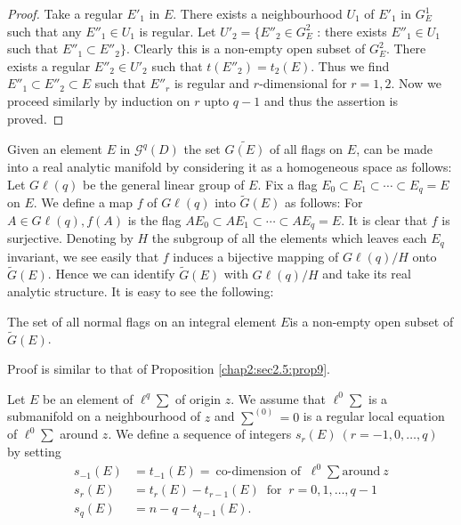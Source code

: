 \begin{proof}
  Take a regular $E'_1$ in $E$. There exists a neighbourhood $U_1$ of
  $E'_1$ in $G^1_E$ such that any $E''_1 \in U_1$ is regular. Let
  $U'_2 = \{E''_2 \in G^2_E $ : there exists $E''_1 \in U_1$ such that
  $E''_1 \subset E''_2 \}$. Clearly this is a non-empty open subset of
  $G^2_E$. There exists a regular $E''_2 \in U'_2$ such that $t
  (E''_2) = t_2 (E)$. Thus we find $E''_1 \subset  E''_2 \subset E$
  such that $E''_r$ is regular and $r$-dimensional for $r = 1,  2$. Now
  we proceed similarly by induction on $r$ upto $q-1$ and thus the
  assertion is proved.  
\end{proof}

Given an element $E$ in $\mathscr{G}^q (D)$ the set $\widetilde{G(E)}$ of all
flags on $E$,  can be made into a real analytic manifold by
considering it as a homogeneous space as follows: Let $G \ell (q)$ be
the general linear group of $E$. Fix a flag $E_0 \subset E_1 \subset
\cdots \subset E_q = E$ on $E$. We define a map $f$ of $G \ell (q)$
into $\tilde{G} (E)$ as follows: For $A \in G \ell (q), f(A)$ is the
flag $AE_0 \subset AE_1 \subset \cdots \subset AE_q = E$. It is clear
that $f$ is surjective. Denoting by $H$ the subgroup of all the
elements which  leaves each $E_q$ invariant,  we see easily that $f$
induces a bijective mapping of $G \ell (q)  / H$ onto $\tilde{G}
(E)$. Hence we can identify $\tilde{G} (E)$ with $G \ell (q) / H$ and
take its real analytic structure. It is easy to see  the following: 

\begin{proposition}\label{chap2:sec2.5:prop10}  %
  The set of all normal flags on an integral element  $E$\pageoriginale is a
  non-empty open subset of $\tilde{G} (E)$. 
\end{proposition}

Proof is similar to that of Proposition \ref{chap2:sec2.5:prop9}.

Let $E$ be an element of $\ell^q \sum$ of origin $z$. We assume that
$\ell^0 \sum$ is a submanifold on a neighbourhood of $z$ and
$\sum^{(0)}= 0$ is a regular local equation of $\ell^0 \sum$ around
$z$. We define a sequence of integers $s_r (E) ~ (r = - 1,  0,  \ldots
,  q)$ by setting 
\begin{align*}
  s_{-1} (E) & = t_{-1} (E)  = ~\text {co-dimension of }~ \ell^0 \sum
  \text{around}  ~ z\\ 
  s_r (E) & = t_r (E) - t_{r-1} (E) ~\text{ for }~ r = 0,  1,  \ldots ,  q-1\\
  s_q (E) & = n - q-t_{q-1} (E).
\end{align*}

